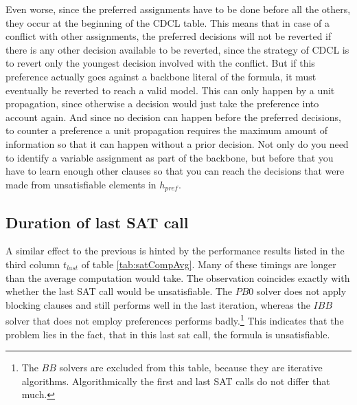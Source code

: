 Even worse, since the preferred assignments have to be done before all the others, they occur at the beginning of the CDCL table. This means that in case of a conflict with other assignments, the preferred decisions will not be reverted if there is any other decision available to be reverted, since the strategy of CDCL is to revert only the youngest decision involved with the conflict. But if this preference actually goes against a backbone literal of the formula, it must eventually be reverted to reach a valid model. This can only happen by a unit propagation, since otherwise a decision would just take the preference into account again. And since no decision can happen before the preferred decisions, to counter a preference a unit propagation requires the maximum amount of information so that it can happen without a prior decision. Not only do you need to identify a variable assignment as part of the backbone, but before that you have to learn enough other clauses so that you can reach the decisions that were made from unsatisfiable elements in $h_{pref}$.






\subsection{Duration of last SAT call}
\label{ss:durLastCall}
A similar effect to the previous is hinted by the performance results listed in the third column $t_{last}$ of table \ref{tab:satCompAvg}. Many of these timings are longer than the average computation would take. The observation coincides exactly with whether the last SAT call would be unsatisfiable. The $PB0$ solver does not apply blocking clauses and still performs well in the last iteration, whereas the $IBB$ solver that does not employ preferences performs badly.\footnote{The $BB$ solvers are excluded from this table, because they are iterative algorithms. Algorithmically the first and last SAT calls do not differ that much.} This indicates that the problem lies in the fact, that in this last sat call, the formula is unsatisfiable.

